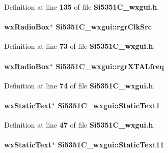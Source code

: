 Definition at line {\bf 135} of file {\bf Si5351\+C\+\_\+wxgui.\+h}.

\paragraph[{rgr\+Clk\+Src}]{\setlength{\rightskip}{0pt plus 5cm}wx\+Radio\+Box$\ast$ Si5351\+C\+\_\+wxgui\+::rgr\+Clk\+Src}\label{classSi5351C__wxgui_aaf98c566ee5cb470bfe0bb51d910e6a1}


Definition at line {\bf 73} of file {\bf Si5351\+C\+\_\+wxgui.\+h}.

\paragraph[{rgr\+X\+T\+A\+Lfreq}]{\setlength{\rightskip}{0pt plus 5cm}wx\+Radio\+Box$\ast$ Si5351\+C\+\_\+wxgui\+::rgr\+X\+T\+A\+Lfreq}\label{classSi5351C__wxgui_aa4ef4b429b03b2c727955441ca821563}


Definition at line {\bf 74} of file {\bf Si5351\+C\+\_\+wxgui.\+h}.

\paragraph[{Static\+Text1}]{\setlength{\rightskip}{0pt plus 5cm}wx\+Static\+Text$\ast$ Si5351\+C\+\_\+wxgui\+::\+Static\+Text1}\label{classSi5351C__wxgui_aa8e22dc4a5d9bf8bdcfb4f6078cd1275}


Definition at line {\bf 47} of file {\bf Si5351\+C\+\_\+wxgui.\+h}.

\paragraph[{Static\+Text11}]{\setlength{\rightskip}{0pt plus 5cm}wx\+Static\+Text$\ast$ Si5351\+C\+\_\+wxgui\+::\+Static\+Text11}\label{classSi5351C__wxgui_a4a635e53ddd0d6b0650b8ed940b14a86}


